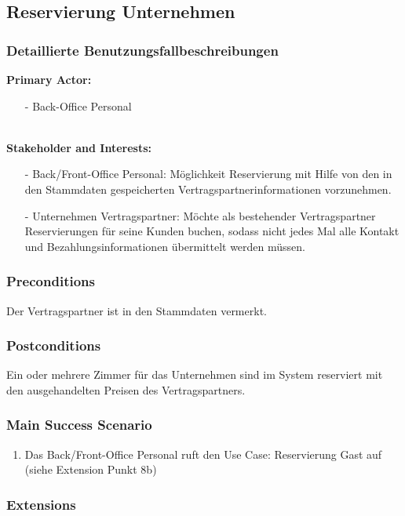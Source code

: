 \documentclass[./detailed_overview_usecases.tex]{subfiles}
\begin{document}
    \subsection{Reservierung Unternehmen}
    \subsubsection{Detaillierte Benutzungsfallbeschreibungen}

    \textbf{Primary Actor: }
    \begin{itemize}
        \item [-] Back-Office Personal
    \end{itemize}
    \\
    \textbf{Stakeholder and Interests:}
    \begin{itemize}
        \item[-] Back/Front-Office Personal: Möglichkeit Reservierung mit Hilfe von den in den Stammdaten gespeicherten Vertragspartnerinformationen vorzunehmen.
        \item[-] Unternehmen Vertragspartner: Möchte als bestehender Vertragspartner Reservierungen für seine Kunden buchen, sodass nicht jedes Mal alle Kontakt und Bezahlungsinformationen übermittelt werden müssen.
    \end{itemize}

    \subsubsection*{Preconditions}
    Der Vertragspartner ist in den Stammdaten vermerkt.

    \subsubsection*{Postconditions}
    Ein oder mehrere Zimmer für das Unternehmen sind im System reserviert mit den ausgehandelten Preisen des Vertragspartners.

    \subsubsection*{Main Success Scenario}
    \begin{enumerate}
        \item Das Back/Front-Office Personal ruft den Use Case: Reservierung Gast auf (siehe Extension Punkt 8b)
    \end{enumerate}

    \subsubsection*{Extensions}
    \item
\end{document}
